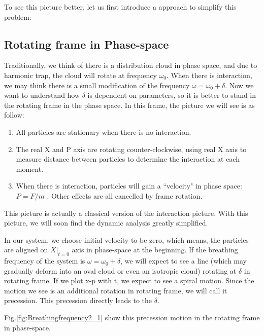 \documentclass[aps,pre,twocolumn,groupedaddress]{revtex4-1}
\begin{document}
To see this picture better, let us first introduce a approach to simplify this problem:

\subsection{Rotating frame in Phase-space}
Traditionally, we think of there is a distribution cloud in phase space, and due to harmonic trap, the cloud will rotate at frequency $\omega_0$. When there is interaction, we may think there is a small modification of the frequency $\omega=\omega_0+\delta$. Now we want to understand how $\delta$ is dependent on parameters, so it is better to stand in the rotating frame in the phase space. In this frame, the picture we will see is as follow:\\
\begin{enumerate}[\textbf{*}]
\item All particles are stationary when there is no interaction.
\item The real X and P axis are rotating counter-clockwise, using real X axis to measure distance between particles to determine the interaction at each moment.
\item When there is interaction, particles will gain a ``velocity" in phase space: $\dot{P}=F/m$ . Other effects are all cancelled by frame rotation.
\end{enumerate}


This picture is actually a classical version of the interaction picture. With this picture, we will soon find the dynamic analysis greatly simplified.

In our system, we choose initial velocity to be zero, which means, the particles are aligned on $X|_{t=0}$ axis in phase-space at the beginning. If the breathing frequency of the system is $\omega=\omega_0+\delta$, we will expect to see a line (which may gradually deform into an oval cloud or even an isotropic cloud) rotating at $\delta$ in rotating frame. If we plot x-p with t, we expect to see a spiral motion. Since the motion we see is an additional rotation in rotating frame, we will call it precession. This precession directly leads to the $\delta$.

Fig.\ref{fig:Breathingfrequency2_1} show this precession motion in the rotating frame in phase-space.
\end{document}
